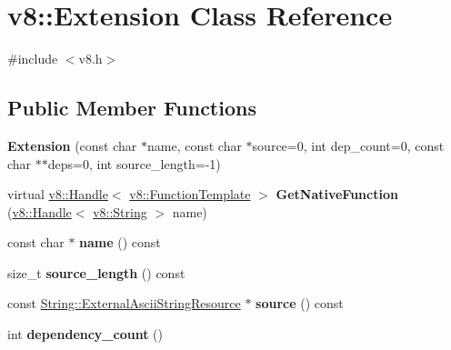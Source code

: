 \hypertarget{classv8_1_1_extension}{}\section{v8\+:\+:Extension Class Reference}
\label{classv8_1_1_extension}


{\ttfamily \#include $<$v8.\+h$>$}

\subsection*{Public Member Functions}
\begin{DoxyCompactItemize}
\item 
\hypertarget{classv8_1_1_extension_a10868673b7801cc1139ca3bc09bcfcf6}{}{\bfseries Extension} (const char $\ast$name, const char $\ast$source=0, int dep\+\_\+count=0, const char $\ast$$\ast$deps=0, int source\+\_\+length=-\/1)\label{classv8_1_1_extension_a10868673b7801cc1139ca3bc09bcfcf6}

\item 
\hypertarget{classv8_1_1_extension_ae526b557e0403910f6a32da2d59f64c1}{}virtual \hyperlink{classv8_1_1_handle}{v8\+::\+Handle}$<$ \hyperlink{classv8_1_1_function_template}{v8\+::\+Function\+Template} $>$ {\bfseries Get\+Native\+Function} (\hyperlink{classv8_1_1_handle}{v8\+::\+Handle}$<$ \hyperlink{classv8_1_1_string}{v8\+::\+String} $>$ name)\label{classv8_1_1_extension_ae526b557e0403910f6a32da2d59f64c1}

\item 
\hypertarget{classv8_1_1_extension_a183946edbf28789f7cddecdad2d26f96}{}const char $\ast$ {\bfseries name} () const \label{classv8_1_1_extension_a183946edbf28789f7cddecdad2d26f96}

\item 
\hypertarget{classv8_1_1_extension_a91da6067f79c5c354aa3184ed0746966}{}size\+\_\+t {\bfseries source\+\_\+length} () const \label{classv8_1_1_extension_a91da6067f79c5c354aa3184ed0746966}

\item 
\hypertarget{classv8_1_1_extension_a97aa9a425f31d453161540e37c19c0ce}{}const \hyperlink{classv8_1_1_string_1_1_external_ascii_string_resource}{String\+::\+External\+Ascii\+String\+Resource} $\ast$ {\bfseries source} () const \label{classv8_1_1_extension_a97aa9a425f31d453161540e37c19c0ce}

\item 
\hypertarget{classv8_1_1_extension_a7623b08e3bc42d903bd923a00317b7f9}{}int {\bfseries dependency\+\_\+count} ()\label{classv8_1_1_extension_a7623b08e3bc42d903bd923a00317b7f9}


\end{DoxyCompactItemize}
